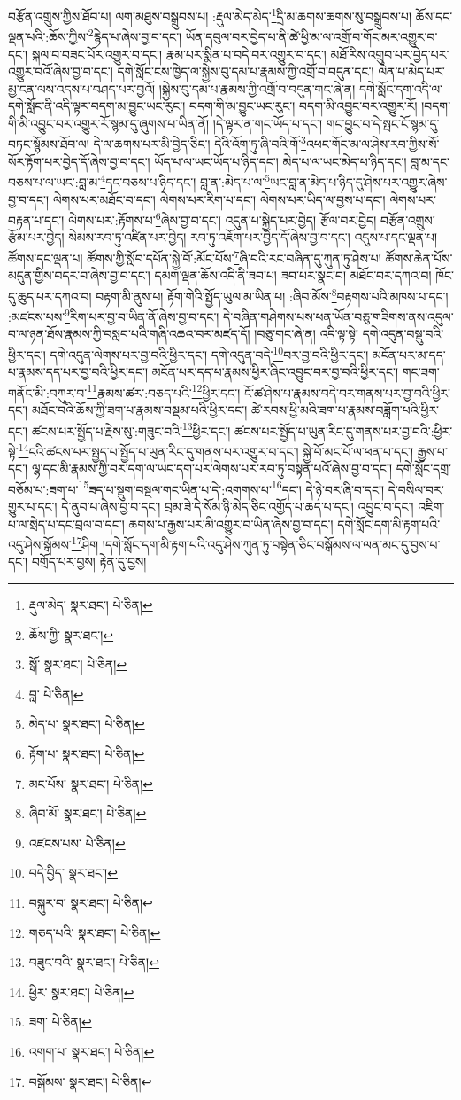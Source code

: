 བརྩོན་འགྲུས་ཀྱིས་ཐོབ་པ། ལག་མཐུས་བསྒྲུབས་པ། :རྡུལ་མེད་མེད་\footnote{རྡུལ་མེད་  སྣར་ཐང་།  པེ་ཅིན། }དྲི་མ་ཆགས་ཆགས་སུ་བསྒྲུབས་པ། ཆོས་དང་ལྡན་པའི་:ཆོས་ཀྱིས་\footnote{ཆོས་ཀྱི་  སྣར་ཐང་། }རྙེད་པ་ཞེས་བྱ་བ་དང་། ཡོན་དབུལ་བར་བྱེད་པ་ནི་ཚེ་ཕྱི་མ་ལ་འགྲོ་བ་གོང་མར་འགྱུར་བ་དང་། སྐལ་བ་བཟང་པོར་འགྱུར་བ་དང་། རྣམ་པར་སྨིན་པ་བདེ་བར་འགྱུར་བ་དང་། མཐོ་རིས་འགྲུབ་པར་བྱེད་པར་འགྱུར་བའོ་ཞེས་བྱ་བ་དང་། དགེ་སློང་ངས་ཁྱེད་ལ་སྐྱེས་བུ་དམ་པ་རྣམས་ཀྱི་འགྲོ་བ་བདུན་དང་། ལེན་པ་མེད་པར་མྱ་ངན་ལས་འདས་པ་བཤད་པར་བྱའོ། །སྐྱེས་བུ་དམ་པ་རྣམས་ཀྱི་འགྲོ་བ་བདུན་གང་ཞེ་ན། དགེ་སློང་དག་འདི་ལ་དགེ་སློང་ནི་འདི་ལྟར་བདག་མ་བྱུང་ཡང་རུང་། བདག་གི་མ་བྱུང་ཡང་རུང་། བདག་མི་འབྱུང་བར་འགྱུར་རོ། །བདག་གི་མི་འབྱུང་བར་འགྱུར་རོ་སྙམ་དུ་ཞུགས་པ་ཡིན་ནོ། །དེ་ལྟར་ན་གང་ཡོད་པ་དང་། གང་བྱུང་བ་དེ་སྤང་ངོ་སྙམ་དུ་བཏང་སྙོམས་ཐོབ་ལ། དེ་ལ་ཆགས་པར་མི་བྱེད་ཅིང་། དེའི་འོག་ཏུ་ཞི་བའི་གོ་\footnote{སྒོ་  སྣར་ཐང་།  པེ་ཅིན། }འཕང་གོང་མ་ལ་ཤེས་རབ་ཀྱིས་སོ་སོར་རྟོག་པར་བྱེད་དོ་ཞེས་བྱ་བ་དང་། ཡོད་པ་ལ་ཡང་ཡོད་པ་ཉིད་དང་། མེད་པ་ལ་ཡང་མེད་པ་ཉིད་དང་། བླ་མ་དང་བཅས་པ་ལ་ཡང་:བླ་མ་\footnote{བླ་  པེ་ཅིན། }དང་བཅས་པ་ཉིད་དང་། བླ་ན་:མེད་པ་ལ་\footnote{མེད་པ་  སྣར་ཐང་།  པེ་ཅིན། }ཡང་བླ་ན་མེད་པ་ཉིད་དུ་ཤེས་པར་འགྱུར་ཞེས་བྱ་བ་དང་། ལེགས་པར་མཐོང་བ་དང་། ལེགས་པར་རིག་པ་དང་། ལེགས་པར་ཡིད་ལ་བྱས་པ་དང་། ལེགས་པར་བརྟན་པ་དང་། ལེགས་པར་:རྟོགས་པ་\footnote{རྟོག་པ་  སྣར་ཐང་།  པེ་ཅིན། }ཞེས་བྱ་བ་དང་། འདུན་པ་སྐྱེད་པར་བྱེད། རྩོལ་བར་བྱེད། བརྩོན་འགྲུས་རྩོམ་པར་བྱེད། སེམས་རབ་ཏུ་འཛིན་པར་བྱེད། རབ་ཏུ་འཇོག་པར་བྱེད་དོ་ཞེས་བྱ་བ་དང་། འདུས་པ་དང་ལྡན་པ། ཚོགས་དང་ལྡན་པ། ཚོགས་ཀྱི་སློབ་དཔོན་སྐྱེ་བོ་:མོང་པོས་\footnote{མང་པོས་  སྣར་ཐང་།  པེ་ཅིན། }ཞི་བའི་རང་བཞིན་དུ་ཀུན་ཏུ་ཤེས་པ། ཚོགས་ཆེན་པོས་མདུན་གྱིས་བདར་བ་ཞེས་བྱ་བ་དང་། དམག་ལྡན་ཆོས་འདི་ནི་ཟབ་པ། ཟབ་པར་སྣང་བ། མཐོང་བར་དཀའ་བ། ཁོང་དུ་ཆུད་པར་དཀའ་བ། བརྟག་མི་ནུས་པ། རྟོག་གེའི་སྤྱོད་ཡུལ་མ་ཡིན་པ། :ཞིབ་མོས་\footnote{ཞིབ་མོ་  སྣར་ཐང་།  པེ་ཅིན། }བརྟགས་པའི་མཁས་པ་དང་། :མཛངས་པས་\footnote{འཛངས་པས་  པེ་ཅིན། }རིག་པར་བྱ་བ་ཡིན་ནོ་ཞེས་བྱ་བ་དང་། དེ་བཞིན་གཤེགས་པས་ཕན་ཡོན་བཅུ་གཟིགས་ནས་འདུལ་བ་ལ་ཉན་ཐོས་རྣམས་ཀྱི་བསླབ་པའི་གཞི་འཆའ་བར་མཛད་དོ། །བཅུ་གང་ཞེ་ན། འདི་ལྟ་སྟེ། དགེ་འདུན་བསྡུ་བའི་ཕྱིར་དང་། དགེ་འདུན་ལེགས་པར་བྱ་བའི་ཕྱིར་དང་། དགེ་འདུན་བདེ་\footnote{བདེ་བྱིད་  སྣར་ཐང་། }བར་བྱ་བའི་ཕྱིར་དང་། མངོན་པར་མ་དད་པ་རྣམས་དད་པར་བྱ་བའི་ཕྱིར་དང་། མངོན་པར་དད་པ་རྣམས་ཕྱིར་ཞིང་འབྱུང་བར་བྱ་བའི་ཕྱིར་དང་། གང་ཟག་གནོང་མི་:བཀུར་བ་\footnote{བསྐུར་བ་  སྣར་ཐང་།  པེ་ཅིན། }རྣམས་ཚར་:བཅད་པའི་\footnote{གཅད་པའི་  སྣར་ཐང་།  པེ་ཅིན། }ཕྱིར་དང་། ངོ་ཚ་ཤེས་པ་རྣམས་བདེ་བར་གནས་པར་བྱ་བའི་ཕྱིར་དང་། མཐོང་བའི་ཆོས་ཀྱི་ཟག་པ་རྣམས་བསྡམ་པའི་ཕྱིར་དང་། ཚེ་རབས་ཕྱི་མའི་ཟག་པ་རྣམས་བཟློག་པའི་ཕྱིར་དང་། ཚངས་པར་སྤྱོད་པ་རྗེས་སུ་:གཟུང་བའི་\footnote{བཟུང་བའི་  སྣར་ཐང་།  པེ་ཅིན། }ཕྱིར་དང་། ཚངས་པར་སྤྱོད་པ་ཡུན་རིང་དུ་གནས་པར་བྱ་བའི་:ཕྱིར་སྟེ་\footnote{ཕྱིར་  སྣར་ཐང་།  པེ་ཅིན། }ངའི་ཚངས་པར་སྤྱད་པ་སྤྱོད་པ་ཡུན་རིང་དུ་གནས་པར་འགྱུར་བ་དང་། སྐྱེ་བོ་མང་པོ་ལ་ཕན་པ་དང་། རྒྱས་པ་དང་། ལྷ་དང་མི་རྣམས་ཀྱི་བར་དག་ལ་ཡང་དག་པར་ལེགས་པར་རབ་ཏུ་བསྟན་པའོ་ཞེས་བྱ་བ་དང་། དགེ་སློང་དགྲ་བཅོམ་པ་:ཟག་པ་\footnote{ཟག་  པེ་ཅིན། }ཟད་པ་སྡུག་བསྔལ་གང་ཡིན་པ་དེ་:འགགས་པ་\footnote{འགག་པ་  སྣར་ཐང་།  པེ་ཅིན། }དང་། དེ་ཉེ་བར་ཞི་བ་དང་། དེ་བསིལ་བར་གྱུར་པ་དང་། དེ་ནུབ་པ་ཞེས་བྱ་བ་དང་། བྲམ་ཟེ་དེ་སོམ་ཉི་མེད་ཅིང་འགྱོད་པ་ཆད་པ་དང་། འབྱུང་བ་དང་། འཇིག་པ་ལ་སྲེད་པ་དང་བྲལ་བ་དང་། ཆགས་པ་རྒྱས་པར་མི་འགྱུར་བ་ཡིན་ཞེས་བྱ་བ་དང་། དགེ་སློང་དག་མི་རྟག་པའི་འདུ་ཤེས་སྒོམས་\footnote{བསྒོམས་  སྣར་ཐང་།  པེ་ཅིན། }ཤིག །དགེ་སློང་དག་མི་རྟག་པའི་འདུ་ཤེས་ཀུན་ཏུ་བསྟེན་ཅིང་བསྒོམས་ལ་ལན་མང་དུ་བྱས་པ་དང་། བགྲོད་པར་བྱས། རྟེན་དུ་བྱས། 